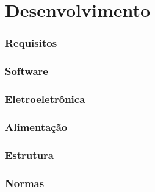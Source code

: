 \chapter{Desenvolvimento}
  \subsection{Requisitos}
  
  
  \subsection{Software}
  
  \subsection{Eletroeletrônica}
  
  \subsection{Alimentação}
  
  \subsection{Estrutura}
  
  \subsection{Normas}
  